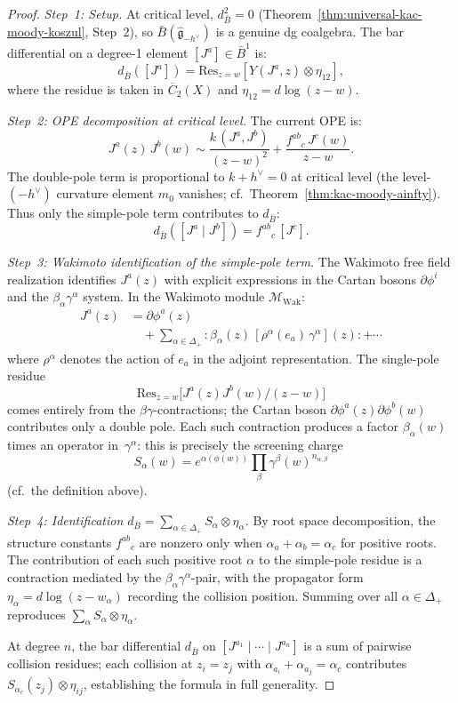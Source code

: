 \begin{proof}
\emph{Step~1: Setup.}
At critical level, $d_{\bar{B}}^2 = 0$ (Theorem~\ref{thm:universal-kac-moody-koszul}, Step~2), so $\bar{B}(\widehat{\mathfrak{g}}_{-h^\vee})$ is a genuine dg coalgebra.  The bar differential on a degree-1 element $[J^a] \in \bar{B}^1$ is:
\[
d_{\bar{B}}([J^a]) = \mathrm{Res}_{z=w}\left[Y(J^a,z) \otimes \eta_{12}\right],
\]
where the residue is taken in $\overline{C}_2(X)$ and $\eta_{12} = d\log(z-w)$.

\emph{Step~2: OPE decomposition at critical level.}
The current OPE is:
\[
J^a(z)\,J^b(w) \sim \frac{k\,(J^a,J^b)}{(z-w)^2} + \frac{f^{ab}{}_c\,J^c(w)}{z-w}.
\]
The double-pole term is proportional to $k + h^\vee = 0$ at critical level (the level-$(-h^\vee)$ curvature element $m_0$ vanishes; cf.\ Theorem~\ref{thm:kac-moody-ainfty}).  Thus only the simple-pole term contributes to $d_{\bar{B}}$:
\[
d_{\bar{B}}([J^a \mid J^b]) = f^{ab}{}_c\,[J^c].
\]

\emph{Step~3: Wakimoto identification of the simple-pole term.}
The Wakimoto free field realization \cite{Wakimoto86} identifies $J^a(z)$ with explicit expressions in the Cartan bosons $\partial\phi^i$ and the $\beta_\alpha\gamma^\alpha$ system.  In the Wakimoto module $\mathcal{M}_{\mathrm{Wak}}$:
\begin{align*}
J^a(z) &= \partial\phi^a(z) \\
  &\quad + \sum_{\alpha \in \Delta_+}
  :\!\beta_\alpha(z)\,[\rho^\alpha(e_a)\,\gamma^\alpha](z)\!:
  + \cdots
\end{align*}
where $\rho^\alpha$ denotes the action of $e_a$ in the adjoint
representation.  The single-pole residue
\[
\mathrm{Res}_{z=w}\bigl[J^a(z)J^b(w)/(z-w)\bigr]
\]
comes entirely from the $\beta\gamma$-contractions; the Cartan boson
$\partial\phi^a(z)\partial\phi^b(w)$ contributes only a double pole.
Each such contraction produces a factor $\beta_\alpha(w)$ times an
operator in~$\gamma^\alpha$: this is precisely the screening charge
\[
S_\alpha(w) = e^{\alpha(\phi(w))}\prod_\beta \gamma^\beta(w)^{n_{\alpha,\beta}}
\]
(cf.\ the definition above).

\emph{Step~4: Identification $d_{\bar{B}} = \sum_{\alpha\in\Delta_+} S_\alpha \otimes \eta_\alpha$.}
By root space decomposition, the structure constants $f^{ab}{}_c$ are nonzero only when $\alpha_a + \alpha_b = \alpha_c$ for positive roots.  The contribution of each such positive root $\alpha$ to the simple-pole residue is a contraction mediated by the $\beta_\alpha\gamma^\alpha$-pair, with the propagator form $\eta_\alpha = d\log(z - w_\alpha)$ recording the collision position.  Summing over all $\alpha \in \Delta_+$ reproduces $\sum_\alpha S_\alpha \otimes \eta_\alpha$.

At degree $n$, the bar differential $d_{\bar{B}}$ on $[J^{a_1} \mid \cdots \mid J^{a_n}]$ is a sum of pairwise collision residues; each collision at $z_i = z_j$ with $\alpha_{a_i} + \alpha_{a_j} = \alpha_c$ contributes $S_{\alpha_c}(z_j)\otimes\eta_{ij}$, establishing the formula in full generality.
\end{proof}

